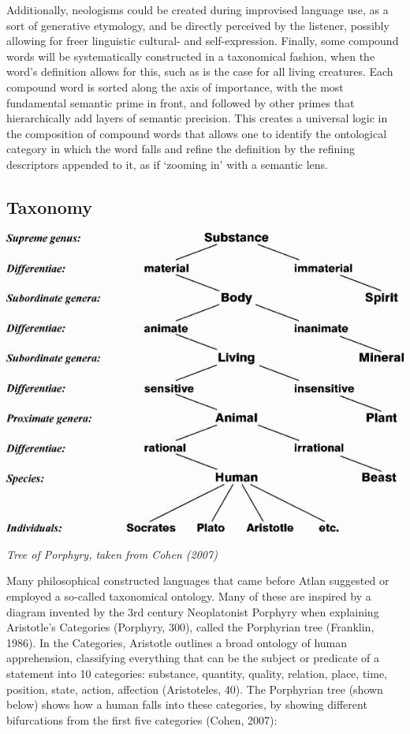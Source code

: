 Additionally, neologisms could be created during improvised language use, as a sort of generative etymology, and be directly perceived by the listener, possibly allowing for freer linguistic cultural- and self-expression. Finally, some compound words will be systematically constructed in a taxonomical fashion, when the word’s definition allows for this, such as is the case for all living creatures. Each compound word is sorted along the axis of importance, with the most fundamental semantic prime in front, and followed by other primes that hierarchically add layers of semantic precision. This creates a universal logic in the composition of compound words that allows one to identify the ontological category in which the word falls and refine the definition by the refining descriptors appended to it, as if ‘zooming in’ with a semantic lens.


\subsection{Taxonomy}

\vspace{0.3cm}
\begin{center}
\includegraphics[scale=0.5]{./Images/tree.jpeg}

{\footnotesize \it Tree of Porphyry, taken from Cohen (2007)}
\end{center}

\noindent Many philosophical constructed languages that came before Atlan suggested or employed a so-called taxonomical ontology. Many of these are inspired by a diagram invented by the 3rd century Neoplatonist Porphyry when explaining Aristotle’s Categories (Porphyry, 300), called the Porphyrian tree (Franklin, 1986). In the Categories, Aristotle outlines a broad ontology of human apprehension, classifying everything that can be the subject or predicate of a statement into 10 categories: substance, quantity, quality, relation, place, time, position, state, action, affection (Aristoteles, 40). The Porphyrian tree (shown below) shows how a human falls into these categories, by showing different bifurcations from the first five categories (Cohen, 2007): 

